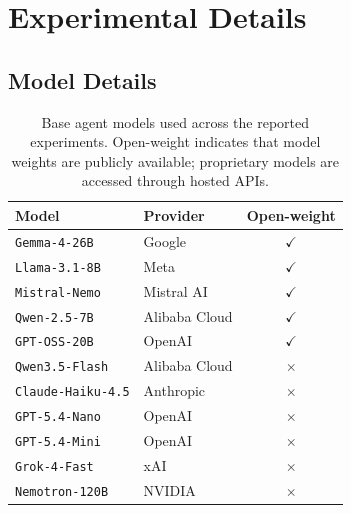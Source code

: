 \documentclass{article}
\begin{document}
\newpage



\section{Experimental Details}
\label{app:experimental-details}

\subsection{Model Details}
\label{app:model-details}

\begin{table}[h]
\centering
\caption{Base agent models used across the reported experiments. Open-weight indicates that model weights are publicly available; proprietary models are accessed through hosted APIs.}
\label{tab:model-details}
\begingroup
\small
{}
\newcommand{\sgOpenYes}{\textcolor{green!55!black}{\(\checkmark\)}}
\newcommand{\sgOpenNo}{\textcolor{red!65!black}{\(\times\)}}
\setlength{\tabcolsep}{7pt}
\renewcommand{\arraystretch}{1.08}
\begin{tabular}{@{}llc@{}}
\toprule
\rowcolor{sgAppHeader}
\textbf{Model} & \textbf{Provider} & \textbf{Open-weight} \\
\midrule
\rowcolor{sgAppStripe}
\texttt{Gemma-4-26B} & Google & \sgOpenYes \\
\texttt{Llama-3.1-8B} & Meta & \sgOpenYes \\
\rowcolor{sgAppStripe}
\texttt{Mistral-Nemo} & Mistral AI & \sgOpenYes \\
\texttt{Qwen-2.5-7B} & Alibaba Cloud & \sgOpenYes \\
\rowcolor{sgAppStripe}
\texttt{GPT-OSS-20B} & OpenAI & \sgOpenYes \\
\texttt{Qwen3.5-Flash} & Alibaba Cloud & \sgOpenNo \\
\rowcolor{sgAppStripe}
\texttt{Claude-Haiku-4.5} & Anthropic & \sgOpenNo \\
\texttt{GPT-5.4-Nano} & OpenAI & \sgOpenNo \\
\rowcolor{sgAppStripe}
\texttt{GPT-5.4-Mini} & OpenAI & \sgOpenNo \\
\texttt{Grok-4-Fast} & xAI & \sgOpenNo \\
\rowcolor{sgAppStripe}
\texttt{Nemotron-120B} & NVIDIA & \sgOpenNo \\
\bottomrule
\end{tabular}
\endgroup
\vspace{-5pt}
\end{table}
\end{document}
